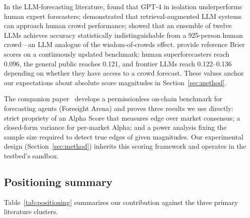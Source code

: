 \documentclass[11pt]{article}
\begin{document}
In the LLM-forecasting literature, \citet{schoenegger2023llmtournament} found that GPT-4 in isolation underperforms human expert forecasters; \citet{halawi2024approaching} demonstrated that retrieval-augmented LLM systems can approach human crowd performance; \citet{schoenegger2024silicon} showed that an ensemble of twelve LLMs achieves accuracy statistically indistinguishable from a 925-person human crowd---an LLM analogue of the wisdom-of-crowds effect. \citet{zou2024forecastbench} provide reference Brier scores on a continuously updated benchmark: human superforecasters reach 0.096, the general public reaches 0.121, and frontier LLMs reach 0.122--0.136 depending on whether they have access to a crowd forecast. These values anchor our expectations about absolute score magnitudes in Section~\ref{sec:method}.

The companion paper~\citep{nechepurenko2026foresight} develops a permissionless on-chain benchmark for forecasting agents (Foresight Arena) and proves three results we use directly: strict propriety of an Alpha Score that measures edge over market consensus; a closed-form variance for per-market Alpha; and a power analysis fixing the sample size required to detect true edges of given magnitudes. Our experimental design (Section~\ref{sec:method}) inherits this scoring framework and operates in the testbed's sandbox.

\subsection{Positioning summary}
\label{sec:related-positioning}

Table~\ref{tab:positioning} summarizes our contribution against the three primary literature clusters.
\end{document}
